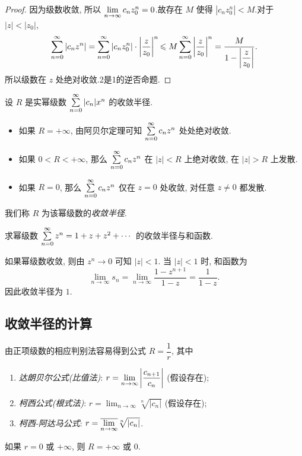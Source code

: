 \begin{proof}
	{ 因为级数收敛, 所以 $\lim\limits_{n\to\infty}c_n z_0^n=0$.故存在 $M$ 使得 $|c_nz_0^n|<M$.对于 $|z|<|z_0|$,
		\[\sum_{n=0}^\infty|c_nz^n|=\sum_{n=0}^\infty|c_nz_0^n|\cdot\left|\frac z{z_0}\right|^n
		{\leqslant M\sum_{n=0}^\infty\left|\frac z{z_0}\right|^n
		=\frac{M}{1-\left|\dfrac z{z_0}\right|}.}\]所以级数在 $z$ 处绝对收敛.\enumnum2是\enumnum1的逆否命题.\qedhere}
\end{proof}

设 $R$ 是实幂级数 $\sum\limits_{n=0}^\infty|c_n|x^n$ 的收敛半径.
\begin{itemize}
	\item 如果 $R=+\infty$, 由阿贝尔定理可知 $\sum\limits_{n=0}^\infty c_nz^n$ 处处绝对收敛.
	\item 如果 $0<R<+\infty$, 那么 $\sum\limits_{n=0}^\infty c_nz^n$ 在 $|z|<R$ 上绝对收敛, 在 $|z|>R$ 上发散.
	\item 如果 $R=0$, 那么 $\sum\limits_{n=0}^\infty c_nz^n$ 仅在 $z=0$ 处收敛, 对任意 $z\neq 0$ 都发散.
\end{itemize}
我们称 $R$ 为该幂级数的\emph{收敛半径}.

\begin{center}
\end{center}

\begin{example}
	求幂级数 $\sum\limits_{n=0}^\infty z^n=1+z+z^2+\cdots$ 的收敛半径与和函数.
\end{example}

\begin{solution}
	如果幂级数收敛, 则由 $z^n\to0$ 可知 $|z|<1$.
	{当 $|z|<1$ 时, 和函数为
		\[\lim_{n\to\infty}s_n=\lim_{n\to\infty}\frac{1-z^{n+1}}{1-z}=\frac1{1-z}.\]因此收敛半径为 $1$.}
\end{solution}

\subsection{收敛半径的计算}

由正项级数的相应判别法容易得到公式 $R=\dfrac1r$, 其中
\begin{enumerate}
	\item \emph{达朗贝尔公式(比值法)}: $r=\displaystyle\lim_{n\to\infty}\left|\frac{c_{n+1}}{c_n}\right|$ (假设存在);
	\item \emph{柯西公式(根式法)}: $r=\displaystyle\lim_{n\to\infty}\sqrt[n]{|c_n|}$ (假设存在);
	\item \emph{柯西-阿达马公式}: $r=\displaystyle\overline{\lim_{n\to\infty}} \sqrt[n]{|c_n|}$.
\end{enumerate}
如果 $r=0$ 或 $+\infty$, 则 $R=+\infty$ 或 $0$.

